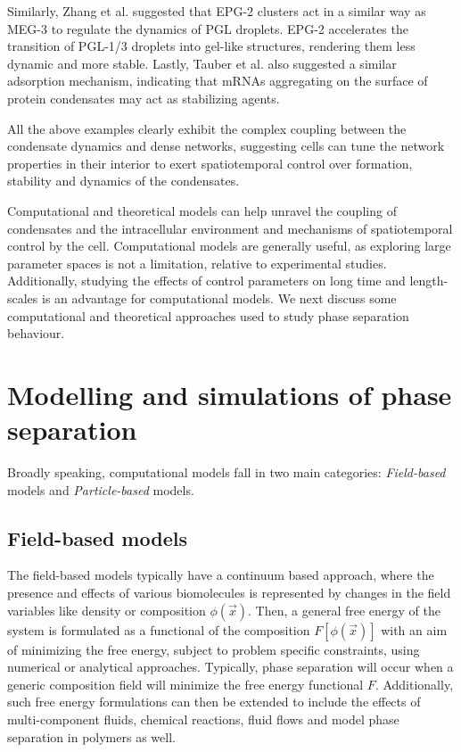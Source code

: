 Similarly, Zhang et al. \cite{Zhang2018} suggested that EPG-2 clusters act in a similar way as MEG-3 to regulate the dynamics of PGL droplets.
EPG-2 accelerates the transition of PGL-1/3 droplets into gel-like structures, rendering them less dynamic and more stable.
Lastly, Tauber et al. \cite{Tauber2020} also suggested a similar adsorption mechanism, indicating that mRNAs aggregating on the surface of protein condensates may act as stabilizing agents.

All the above examples clearly exhibit the complex coupling between the condensate dynamics and dense networks, suggesting cells can tune the network properties in their interior to exert spatiotemporal control over formation, stability and dynamics of the condensates. 

Computational and theoretical models can help unravel the coupling of condensates and the intracellular environment and mechanisms of spatiotemporal control by the cell.
Computational models are generally useful, as exploring large parameter spaces is not a limitation, relative to experimental studies.
Additionally, studying the effects of control parameters on long time and length-scales is an advantage for computational models.
We next discuss some computational and theoretical approaches used to study phase separation behaviour.

\section{Modelling and simulations of phase separation}

Broadly speaking, computational models fall in two main categories: \textit{Field-based} models and \textit{Particle-based} models.

\subsection{Field-based models}

The field-based models typically have a continuum based approach, where the presence and effects of various biomolecules is represented by changes in the field variables like density or composition $\phi(\vec{x})$.
Then, a general free energy of the system is formulated as a functional of the composition $F[\phi(\vec{x})]$ with an aim of minimizing the free energy, subject to problem specific constraints, using numerical or analytical approaches.
Typically, phase separation will occur when a generic composition field will minimize the free energy functional $F$.
Additionally, such free energy formulations can then be extended to include the effects of multi-component fluids, chemical reactions, fluid flows and model phase separation in polymers as well.

